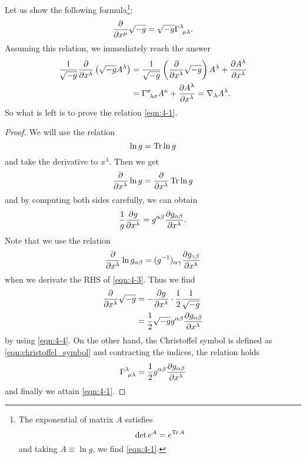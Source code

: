 \documentclass[a4paper,pdftex,10pt]{article}
\begin{document}
Let us show the following formula\footnote{
  The exponential of matrix $A$ satisfies
  \begin{equation}
    \det e^{A}=e^{\Tr A}
    \nonumber
  \end{equation}
  and taking $A\equiv\ln g$, we find \eqref{eqn:4-1}.
}:
\begin{equation}
  \pdv{}{x^{\mu}}\sqrt{-g}
  =
  \sqrt{-g}\Gamma^{\lambda}_{\ \mu\lambda}
  .
  \label{eqn:4-1}
\end{equation}
Assuming this relation, we immediately reach the answer
\begin{align}
  \frac{1}{\sqrt{-g}}\pdv{}{x^{\lambda}}\left(\sqrt{-g}A^{\lambda}\right)
  &=
  \frac{1}{\sqrt{-g}}\left( \pdv{}{x^{\lambda}}\sqrt{-g} \right)A^{\lambda}
  +
  \pdv{A^{\lambda}}{x^{\lambda}}
  \nonumber
  \\
  &=
  \Gamma^{\sigma}_{\ \lambda\sigma}A^{\kappa}
  +
  \pdv{A^{\lambda}}{x^{\lambda}}
  =
  \nabla_{\lambda}A^{\lambda}
  .
\end{align}
So what is left is to prove the relation \eqref{eqn:4-1}.
\begin{proof}
  We will use the relation 
  \begin{equation}
    \ln g
    =
    \Tr \ln g
    \label{eqn:4-2}
  \end{equation}
  and take the derivative to $x^{\lambda}$. Then we get
  \begin{equation}
    \pdv{}{x^{\lambda}}\ln g
    =
    \pdv{}{x^{\lambda}}\Tr\ln g
    \label{eqn:4-3}
  \end{equation}
  and by computing both sides carefully, we can obtain
  \begin{equation}
    \frac{1}{g}\pdv{g}{x^{\lambda}}
    =
    g^{\alpha\beta}\pdv{g_{\alpha\beta}}{x^{\lambda}}
    .    
    \label{eqn:4-4}
  \end{equation} 
  Note that we use the relation 
  \begin{equation}
    \pdv{}{x^{\lambda}}\ln g_{\alpha\beta}
    =
    (g^{-1})_{\alpha\gamma}\pdv{g_{\gamma\beta}}{x^{\lambda}}
  \end{equation}
  when we derivate the RHS of \eqref{eqn:4-3}. Thus we find
  \begin{align}
    \pdv{}{x^{\lambda}}\sqrt{-g}
    &=
    -\pdv{g}{x^{\lambda}}
    \cdot
    \frac{1}{2}\frac{1}{\sqrt{-g}}
    \nonumber
    \\
    &=
    \frac{1}{2}\sqrt{-g}g^{\alpha\beta}\pdv{g_{\alpha\beta}}{x^{\lambda}}
  \end{align}
  by using \eqref{eqn:4-4}. On the other hand, the Christoffel symbol is defined as \eqref{eqn:christoffel_symbol} and contracting the indices, the relation holds
  \begin{equation}
    \Gamma^{\lambda}_{\ \mu\lambda}
    =
    \frac{1}{2}g^{\alpha\beta}\pdv{g_{\alpha\beta}}{x^{\lambda}}
  \end{equation}
  and finally we attain \eqref{eqn:4-1}.
\end{proof}




% 
% 

\end{document}
